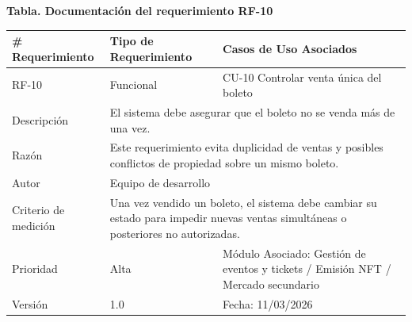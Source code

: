 \documentclass[12pt,letterpaper]{article}
\begin{document}
\noindent
\begin{minipage}{\textwidth}
\centering
\scriptsize
\renewcommand{\arraystretch}{0.9}
\setlength{\tabcolsep}{3pt}
\setlength{\arrayrulewidth}{0.5pt}

\textbf{Tabla. Documentación del requerimiento RF-10}

\vspace{2pt}

\begin{tabularx}{\textwidth}{|p{2.6cm}|X|p{3.4cm}|}
\hline
\# Requerimiento & Tipo de Requerimiento & Casos de Uso Asociados \\ \hline
RF-10 & Funcional & CU-10 Controlar venta única del boleto \\ \hline
Descripción & \multicolumn{2}{X|}{El sistema debe asegurar que el boleto no se venda más de una vez.} \\ \hline
Razón & \multicolumn{2}{X|}{Este requerimiento evita duplicidad de ventas y posibles conflictos de propiedad sobre un mismo boleto.} \\ \hline
Autor & \multicolumn{2}{X|}{Equipo de desarrollo} \\ \hline
Criterio de medición & \multicolumn{2}{X|}{Una vez vendido un boleto, el sistema debe cambiar su estado para impedir nuevas ventas simultáneas o posteriores no autorizadas.} \\ \hline
Prioridad & Alta & Módulo Asociado: Gestión de eventos y tickets / Emisión NFT / Mercado secundario \\ \hline
Versión & 1.0 & Fecha: 11/03/2026 \\ \hline
\end{tabularx}
\end{minipage}

\vspace{0.2cm}
\end{document}
